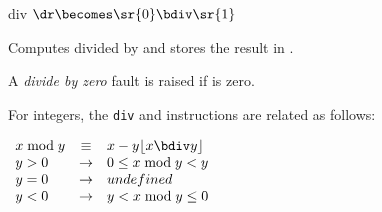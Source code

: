 %
%



\begin{instruction}{div}\label{inst:div}
    {$\dr \becomes \sr{0} \bdiv \sr{1}$}
    {Computes  divided by  and stores the result in \dr.

    A \emph{divide by zero} fault is raised if  is zero.

    For integers, the \texttt{div} and  instructions
    are related as follows:

    \begin{math}
      \begin{array}{lcl}
        x \bmod y & \equiv  & x - y \lfloor {x \bdiv y} \rfloor \\
        y > 0 & \rightarrow & 0 \leq x \bmod y < y \\
        y = 0 & \rightarrow & undefined \\
        y < 0 & \rightarrow & y < x \bmod y \leq 0 \\
      \end{array}
    \end{math}}
\end{instruction}


%
%


